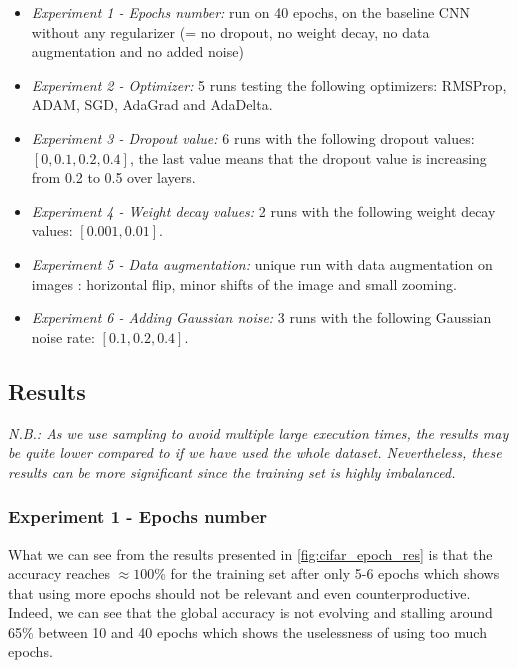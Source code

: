 \documentclass[11pt, openany]{report}
\theoremstyle{plain}
\theoremstyle{definition}
\theoremstyle{remark}
\begin{document}
\begin{itemize}
\item \textit{Experiment 1 - Epochs number:} run on 40 epochs, on the baseline CNN without any regularizer (= no dropout, no weight decay, no data augmentation and no added noise) 

\item \textit{Experiment 2 - Optimizer:} 5 runs testing the following optimizers: RMSProp, ADAM, SGD, AdaGrad and AdaDelta. 

\item \textit{Experiment 3 - Dropout value:} 6 runs with the following dropout values: 
\newline $[0, 0.1, 0.2, 0.4]$, the last value means that the dropout value is increasing from 0.2 to 0.5 over layers.
 
\item \textit{Experiment 4 - Weight decay values:} 2 runs with the following weight decay values: $[0.001, 0.01]$.   

\item \textit{Experiment 5 - Data augmentation:} unique run with data augmentation on images : horizontal flip, minor shifts of the image and small zooming.

\item \textit{Experiment 6 - Adding Gaussian noise:} 3 runs with the following Gaussian noise rate: $[0.1, 0.2, 0.4]$.
\end{itemize}

\subsection{Results} 

\textit{N.B.: As we use sampling to avoid multiple large execution times, the results may be quite lower compared to if we have used the whole dataset. Nevertheless, these results can be more significant since the training set is highly imbalanced.}    

\subsubsection{Experiment 1 - Epochs number} 
What we can see from the results presented in \autoref{fig:cifar_epoch_res} is that the accuracy reaches $\approx 100\%$ for the training set after only 5-6 epochs which shows that using more epochs should not be relevant and even counterproductive. Indeed, we can see that the global accuracy is not evolving and stalling around 65\% between 10 and 40 epochs which shows the uselessness of using too much epochs. 
\end{document}
